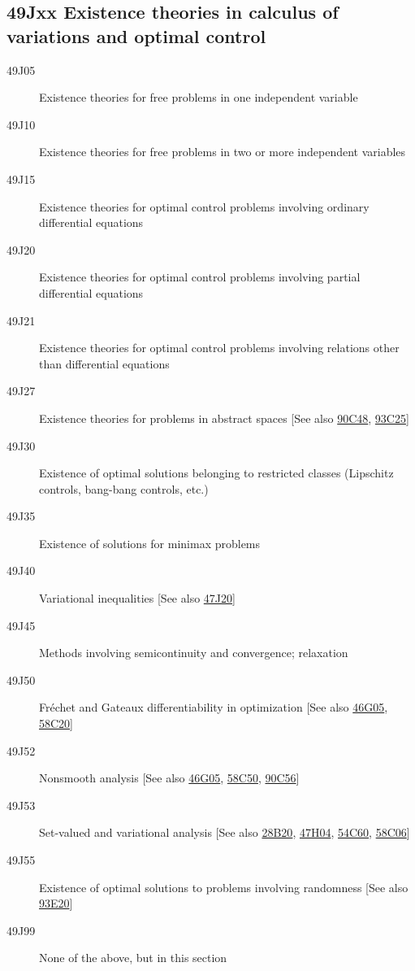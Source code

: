 \subsection*{49Jxx  Existence theories in calculus of variations  and optimal control }\label{49Jxx}
\begin{description}  
\item [49J05]\label{49J05} Existence theories for free problems in one independent variable
\item [49J10]\label{49J10} Existence theories for free problems in two or more independent variables
\item [49J15]\label{49J15} Existence theories for optimal control problems involving ordinary differential equations
\item [49J20]\label{49J20} Existence theories for optimal control problems involving partial differential equations
\item [49J21]\label{49J21} Existence theories for optimal control problems involving relations other than differential equations
\item [49J27]\label{49J27} Existence theories for problems in abstract spaces [See also \hyperref[90C48]{90C48}, \hyperref[93C25]{93C25}]
\item [49J30]\label{49J30} Existence of optimal solutions belonging to restricted classes (Lipschitz controls, bang-bang controls, etc.)
\item [49J35]\label{49J35} Existence of solutions for minimax problems
\item [49J40]\label{49J40} Variational inequalities [See also \hyperref[47J20]{47J20}]
\item [49J45]\label{49J45} Methods involving semicontinuity and convergence; relaxation
\item [49J50]\label{49J50} Fr\'{e}chet and Gateaux differentiability in optimization [See also \hyperref[46G05]{46G05}, \hyperref[58C20]{58C20}]
\item [49J52]\label{49J52} Nonsmooth analysis [See also \hyperref[46G05]{46G05}, \hyperref[58C50]{58C50}, \hyperref[90C56]{90C56}]
\item [49J53]\label{49J53} Set-valued and variational analysis [See also \hyperref[28B20]{28B20}, \hyperref[47H04]{47H04}, \hyperref[54C60]{54C60}, \hyperref[58C06]{58C06}]
\item [49J55]\label{49J55} Existence of optimal solutions to problems involving randomness [See also \hyperref[93E20]{93E20}]
\item [49J99]\label{49J99} None of the above, but in this section  
\end{description}

